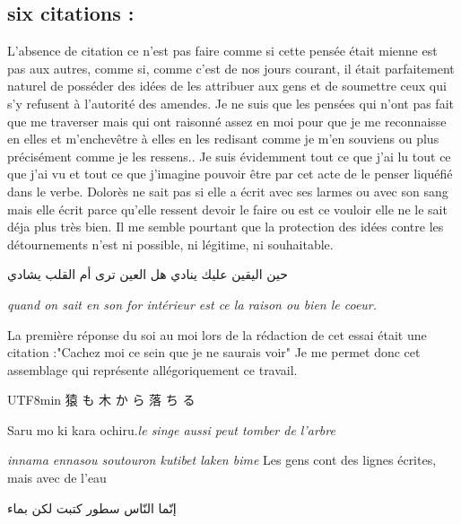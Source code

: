 \documentclass{article}
\begin{document}
 \subsection{ six citations :}
 L'absence de citation ce n'est pas faire comme si  cette pensée était mienne est pas aux autres, comme si, comme c'est de nos jours courant, il était parfaitement naturel de posséder des idées de les attribuer aux gens et de soumettre ceux qui s'y refusent à l'autorité des amendes. 
 Je ne suis que les pensées qui n'ont pas fait que me traverser mais qui ont raisonné assez en moi pour que je me reconnaisse en elles et m'enchevêtre à elles en les redisant comme je m'en souviens ou plus précisément comme je les ressens..
 Je suis évidemment tout ce que j'ai lu tout ce que j'ai vu et tout ce que j'imagine pouvoir être par cet acte de le penser liquéfié dans le verbe.
 Dolorès ne sait pas si elle a écrit avec ses larmes ou avec son sang mais elle écrit parce qu'elle ressent devoir le faire ou est ce vouloir elle ne le sait déja plus très bien. Il me semble pourtant que la protection des idées contre les détournements n'est ni possible, ni légitime, ni souhaitable.
  
  \begin{otherlanguage}{arabic}
 حين اليقين عليك ينادي هل العين ترى أم القلب يشادي
\end{otherlanguage} 
 
\emph{quand on sait en son for intérieur est ce la raison ou bien le coeur.} 

La première réponse du soi au moi lors de la rédaction de cet essai  était une citation :"Cachez moi ce sein que je ne saurais voir"
Je me permet donc cet assemblage  qui représente allégoriquement ce travail.

\begin{CJK}{UTF8}{min} 
猿
も
木
か
ら
落
ち
る
\end{CJK}
 Saru mo ki kara ochiru.\emph{le singe aussi  peut tomber de l'arbre}
  
                                             \emph{innama ennasou soutouron kutibet laken bime} Les gens cont des lignes écrites, mais avec de l'eau
 \begin{center}

                                                             \begin{otherlanguage}{arabic}
إنّما النّاس سطور كتبت لكن بماء 
                                    \end{otherlanguage}             
\end{center}
                        
\end{document}
